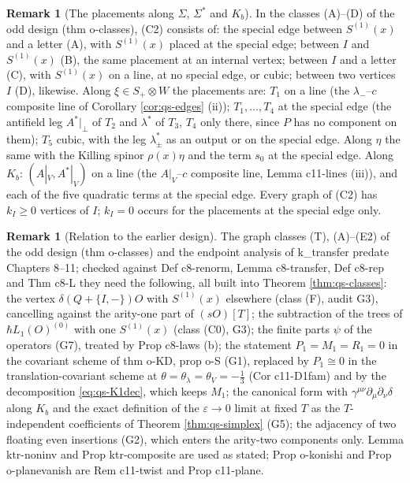 \documentclass[11pt]{article}
\numberwithin{equation}{section}
\theoremstyle{plain}
\theoremstyle{definition}
\newtheorem{remark}[theorem]{Remark}
\newcommand{\AV}{A|_V}
\begin{document}
\begin{remark}[The placements along $\Sigma$, $\Sigma^*$ and $K_b$]
\label{rem:qs-placements}
In the classes (A)--(D) of the odd design (thm o-classes), (C2) consists of: the special edge between $S^{(1)}(x)$ and a letter (A), with $S^{(1)}(x)$ placed at the special edge; between $I$ and $S^{(1)}(x)$ (B), the same placement at an internal vertex; between $I$ and a letter (C), with $S^{(1)}(x)$ on a line, at no special edge, or cubic; between two vertices $I$ (D), likewise. Along $\xi\in S_+\otimes W$ the placements are: $T_1$ on a line (the $\lambda_-$--$c$ composite line of Corollary \ref{cor:qs-edges} (ii)); $T_1,\dots,T_4$ at the special edge (the antifield leg $A^*|_\perp$ of $T_2$ and $\lambda^*$ of $T_3$, $T_4$ only there, since $P$ has no component on them); $T_5$ cubic, with the leg $\lambda^*_\pm$ as an output or on the special edge. Along $\eta$ the same with the Killing spinor $\rho(x)\eta$ and the term $s_0$ at the special edge. Along $K_b$: $(\AV,A^*|_V)$ on a line (the $\AV$--$c$ composite line, Lemma c11-lines (iii)), and each of the five quadratic terms at the special edge. Every graph of (C2) has $k_I\ge0$ vertices of $I$; $k_I=0$ occurs for the placements at the special edge only.
\end{remark}

\begin{remark}[Relation to the earlier design]
\label{rem:qs-design}
The graph classes (T), (A)--(E2) of the odd design (thm o-classes) and the endpoint analysis of k\_transfer predate Chapters 8--11; checked against Def c8-renorm, Lemma c8-transfer, Def c8-rep and Thm c8-L they need the following, all built into Theorem \ref{thm:qs-classes}: the vertex $\delta(Q+\{I,-\})O$ with $S^{(1)}(x)$ elsewhere (class (F), audit G3), cancelling against the arity-one part of $(sO)[T]$; the subtraction of the trees of $\hbar L_1(O)^{(0)}$ with one $S^{(1)}(x)$ (class (C0), G3); the finite parts $\psi$ of the operators (G7), treated by Prop c8-laws (b); the statement $P_1=M_1=R_1=0$ in the covariant scheme of thm o-KD, prop o-S (G1), replaced by $P_1\cong0$ in the translation-covariant scheme at $\theta=\theta_\lambda=\theta_V=-\tfrac13$ (Cor c11-D1fam) and by the decomposition \eqref{eq:qs-K1dec}, which keeps $M_1$; the canonical form with $\gamma^{\mu\nu}\partial_\mu\partial_\nu\delta$ along $K_b$ and the exact definition of the $\varepsilon\to0$ limit at fixed $T$ as the $T$-independent coefficients of Theorem \ref{thm:qs-simplex} (G5); the adjacency of two floating even insertions (G2), which enters the arity-two components only. Lemma ktr-noninv and Prop ktr-composite are used as stated; Prop o-konishi and Prop o-planevanish are Rem c11-twist and Prop c11-plane.
\end{remark}
\end{document}
